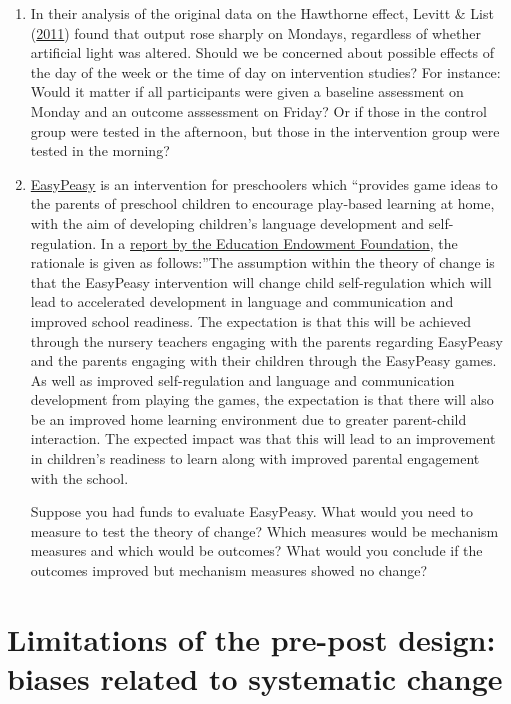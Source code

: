 \documentclass{krantz}
\begin{document}
\begin{enumerate}
\def\labelenumi{\arabic{enumi}.}
\item
  In their analysis of the original data on the Hawthorne effect, Levitt \& List (\protect\hyperlink{ref-levitt2011}{2011}) found that output rose sharply on Mondays, regardless of whether artificial light was altered. Should we be concerned about possible effects of the day of the week or the time of day on intervention studies? For instance: Would it matter if all participants were given a baseline assessment on Monday and an outcome asssessment on Friday? Or if those in the control group were tested in the afternoon, but those in the intervention group were tested in the morning?
\item
  \href{https://guidebook.eif.org.uk/programme/easypeasy}{EasyPeasy} is an intervention for preschoolers which ``provides game ideas to the parents of preschool children to encourage play-based learning at home, with the aim of developing children's language development and self-regulation. In a \href{https://d2tic4wvo1iusb.cloudfront.net/documents/projects/EasyPeasy.pdf?v=1686132397}{report by the Education Endowment Foundation}, the rationale is given as follows:''The assumption within the theory of change is that the EasyPeasy intervention will change child self-regulation which will lead to accelerated development in language and communication and improved school readiness. The expectation is that this will be achieved through the nursery teachers engaging with the parents regarding EasyPeasy and the parents engaging with their children through the EasyPeasy games. As well as improved self-regulation and language and communication development from playing the games, the expectation is that there will also be an improved home learning environment due to greater parent-child interaction. The expected impact was that this will lead to an improvement in children's readiness to learn along with improved parental engagement with the school.

  Suppose you had funds to evaluate EasyPeasy. What would you need to measure to test the theory of change? Which measures would be mechanism measures and which would be outcomes? What would you conclude if the outcomes improved but mechanism measures showed no change?
\end{enumerate}

\hypertarget{prepost}{%
\chapter{Limitations of the pre-post design: biases related to systematic change}\label{prepost}}
\end{document}
